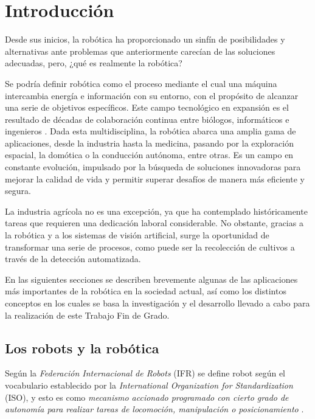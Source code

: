 \chapter{Introducción}
\label{cap:capitulo1}
\setcounter{page}{1}
Desde sus inicios, la robótica ha proporcionado un sinfín de posibilidades y alternativas ante problemas que anteriormente carecían de las soluciones adecuadas, pero, ¿qué es realmente la robótica?

Se podría definir robótica como el proceso mediante el cual una máquina intercambia energía e información con su entorno, con el propósito de alcanzar una serie de objetivos específicos. Este campo tecnológico en expansión es el resultado de décadas de colaboración continua entre biólogos, informáticos e ingenieros \cite{Koditschek21}. Dada esta multidisciplina, la robótica abarca una amplia gama de aplicaciones, desde la industria hasta la medicina, pasando por la exploración espacial, la domótica o la conducción autónoma, entre otras. Es un campo en constante evolución, impulsado por la búsqueda de soluciones innovadoras para mejorar la calidad de vida y permitir superar desafíos de manera más eficiente y segura.

La industria agrícola no es una excepción, ya que ha contemplado históricamente tareas que requieren una dedicación laboral considerable. No obstante, gracias a la robótica y a los sistemas de visión artificial, surge la oportunidad de transformar una serie de procesos, como puede ser la recolección de cultivos a través de la detección automatizada.

En las siguientes secciones se describen brevemente algunas de las aplicaciones más importantes de la robótica en la sociedad actual, así como los distintos conceptos en los cuales se basa la investigación y el desarrollo llevado a cabo para la realización de este Trabajo Fin de Grado.

\section{Los robots y la robótica}
\label{sec:robótica} %

Según la \textit{Federación Internacional de Robots} (IFR) se define robot según el vocabulario establecido por la \textit{International Organization for Standardization} (ISO), y esto es como \textit{mecanismo accionado programado con cierto grado de autonomía para realizar tareas de locomoción, manipulación o posicionamiento} \cite{ISO8373}.

